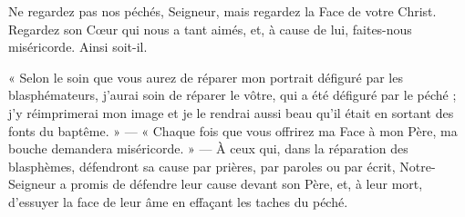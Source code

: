 \documentclass{bibliotheca-missel}
\begin{document}
Ne regardez pas nos péchés, Seigneur, mais regardez la Face de votre Christ. Regardez son Cœur qui nous a tant aimés, et, à cause de lui, faites-nous miséricorde. Ainsi soit-il.
\begin{notice}
« Selon le soin que vous aurez de réparer mon portrait défiguré par les blasphémateurs, j’aurai soin de réparer le vôtre, qui a été défiguré par le péché ; j’y réimprimerai mon image et je le rendrai aussi beau qu’il était en sortant des fonts du baptême. » — « Chaque fois que vous offrirez ma Face à mon Père, ma bouche demandera miséricorde. » — À ceux qui, dans la réparation des blasphèmes, défendront sa cause par prières, par paroles ou par écrit, Notre-Seigneur a promis de défendre leur cause devant son Père, et, à leur mort, d’essuyer la face de leur âme en effaçant les taches du péché.
\end{notice}
\culdelampe





\end{document}
